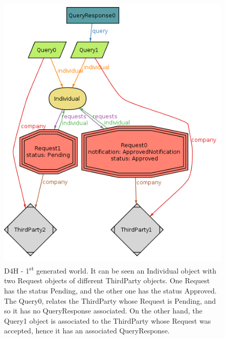 \documentclass[a4paper, hidelinks, 12pt]{report}
\begin{document}
	\begin{figure}[H]
		\centering
		\includegraphics[width=1\textwidth]{Diagrams/goal_2_world_1.png}
		\caption[D4H - First generated world]{D4H - 1\textsuperscript{st} generated world. It can be seen an Individual object with two Request objects of different ThirdParty objects. One Request has the status Pending, and the other one has the status Approved. The Query0, relates the ThirdParty whose Request is Pending, and so it has no QueryResponse associated. On the other hand, the Query1 object is associated to the ThirdParty whose Request was accepted, hence it has an associated QueryResponse.}
		\label{fig:goal_2_world_1}
	\end{figure}
	
\end{document}
